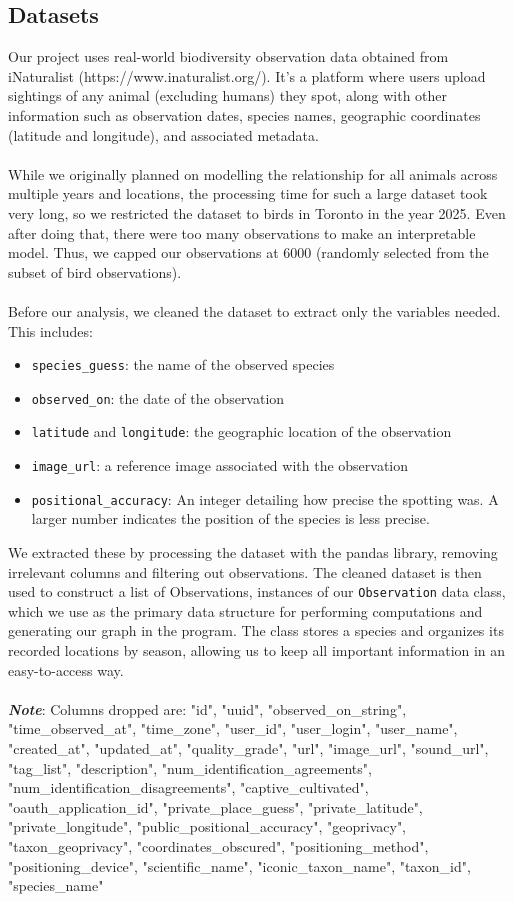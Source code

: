 \documentclass{article}
\begin{document}
\subsection{Datasets}
Our project uses real-world biodiversity observation data obtained from iNaturalist (https://www.inaturalist.org/). It's a platform where users upload sightings of any animal (excluding humans) they spot, along with other information such as observation dates, species names, geographic coordinates (latitude and longitude), and associated metadata.\\ \\
While we originally planned on modelling the relationship for all animals across multiple years and locations, the processing time for such a large dataset took very long, so we restricted the dataset to birds in Toronto in the year 2025. Even after doing that, there were too many observations to make an interpretable model. Thus, we capped our observations at 6000 (randomly selected from the subset of bird observations). \\ \\
Before our analysis, we cleaned the dataset to extract only the variables needed. This includes:
\begin{itemize}
    \item \texttt{species\_guess}: the name of the observed species
    \item \texttt{observed\_on}: the date of the observation
    \item \texttt{latitude} and \texttt{longitude}: the geographic location of the observation
    \item \texttt{image\_url}: a reference image associated with the observation
    \item \texttt{positional\_accuracy}: An integer detailing how precise the spotting was. A larger number indicates the position of the species is less precise.
\end{itemize}
We extracted these by processing the dataset with the pandas library, removing irrelevant columns and filtering out observations. The cleaned dataset is then used to construct a list of Observations, instances of our \texttt{Observation} data class, which we use as the primary data structure for performing computations and generating our graph in the program. The  class stores a species and organizes its recorded locations by season, allowing us to keep all important information in an easy-to-access way.\\ \\
\textit{\textbf{Note}}: Columns dropped are: "id", "uuid", "observed\_on\_string", "time\_observed\_at", "time\_zone", "user\_id", "user\_login", "user\_name", "created\_at", "updated\_at", "quality\_grade", "url", "image\_url", "sound\_url", "tag\_list", "description", "num\_identification\_agreements", "num\_identification\_disagreements", "captive\_cultivated", "oauth\_application\_id", "private\_place\_guess", "private\_latitude", "private\_longitude", "public\_positional\_accuracy", "geoprivacy", "taxon\_geoprivacy", "coordinates\_obscured", "positioning\_method", "positioning\_device", "scientific\_name", "iconic\_taxon\_name", "taxon\_id", "species\_name"
\\ 
\end{document}

